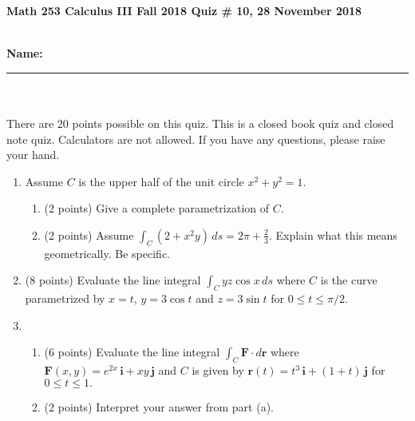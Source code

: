 \documentclass[11pt]{article}
\theoremstyle{remark}
\renewcommand{\d}{\displaystyle}
\begin{document}
{\bf Math 253 Calculus III Fall 2018 \hfill Quiz \# 10,  28 November 2018 }\\
\\
{\bf Name: \rule{3.5in}{1pt}}\\
\\
\noindent There are 20 points possible on this quiz. This is a closed
book quiz and closed note quiz. Calculators are not allowed. If you have any questions, please
raise your hand.

\begin{enumerate}
\item Assume $C$ is the upper half of the unit circle $x^2+y^2=1.$
	\begin{enumerate}
	\item (2 points) Give a complete parametrization of $C.$
	\vfill
	\item (2 points) Assume $\d{\int_C (2+x^2y) \, ds=2 \pi +\frac{2}{3}.}$ Explain what this means geometrically. Be specific.
	\vfill
	\end{enumerate}
\item (8 points) Evaluate the line integral $\d{\int_C yz\cos x \, ds}$ where $C$ is the curve parametrized by $x=t, \, y= 3 \cos t$ and $z=3 \sin t$ for $0 \leq t \leq \pi/2.$
	\vspace{4in}
	\newpage
\item \begin{enumerate} \item (6 points) Evaluate the line integral $\d{\int_C \textbf{F} \cdot d\textbf{r}}$ where $\textbf{F}(x,y)=e^{2x}\,\textbf{i}+xy\,\textbf{j}$ and $C$ is given by $\textbf{r}(t)=t^3 \,\textbf{i} +(1+t) \, \textbf{j}$ for $0 \leq t \leq 1.$
\vfill
\item (2 points) Interpret your answer from part (a).
\vspace{2in}
\end{enumerate}
\end{enumerate}
\end{document}

